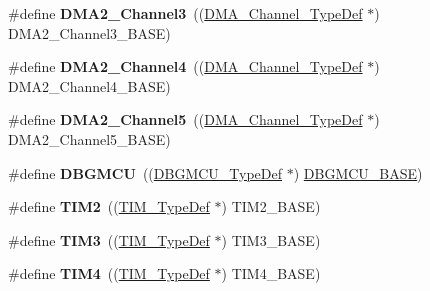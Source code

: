 \begin{DoxyCompactItemize}
\item 
\hypertarget{group___peripheral__declaration_ga6dca52a79587e0ca9a5d669048b4c7eb}{\#define {\bfseries D\-M\-A2\-\_\-\-Channel3}~((\hyperlink{struct_d_m_a___channel___type_def}{D\-M\-A\-\_\-\-Channel\-\_\-\-Type\-Def} $\ast$) D\-M\-A2\-\_\-\-Channel3\-\_\-\-B\-A\-S\-E)}\label{group___peripheral__declaration_ga6dca52a79587e0ca9a5d669048b4c7eb}

\item 
\hypertarget{group___peripheral__declaration_ga612b396657695191ad740b0b59bc9f12}{\#define {\bfseries D\-M\-A2\-\_\-\-Channel4}~((\hyperlink{struct_d_m_a___channel___type_def}{D\-M\-A\-\_\-\-Channel\-\_\-\-Type\-Def} $\ast$) D\-M\-A2\-\_\-\-Channel4\-\_\-\-B\-A\-S\-E)}\label{group___peripheral__declaration_ga612b396657695191ad740b0b59bc9f12}

\item 
\hypertarget{group___peripheral__declaration_ga521c13b7d0f82a6897d47995da392750}{\#define {\bfseries D\-M\-A2\-\_\-\-Channel5}~((\hyperlink{struct_d_m_a___channel___type_def}{D\-M\-A\-\_\-\-Channel\-\_\-\-Type\-Def} $\ast$) D\-M\-A2\-\_\-\-Channel5\-\_\-\-B\-A\-S\-E)}\label{group___peripheral__declaration_ga521c13b7d0f82a6897d47995da392750}

\item 
\hypertarget{group___peripheral__declaration_ga92ec6d9ec2251fda7d4ce09748cd74b4}{\#define {\bfseries D\-B\-G\-M\-C\-U}~((\hyperlink{struct_d_b_g_m_c_u___type_def}{D\-B\-G\-M\-C\-U\-\_\-\-Type\-Def} $\ast$) \hyperlink{group___peripheral__memory__map_ga4adaf4fd82ccc3a538f1f27a70cdbbef}{D\-B\-G\-M\-C\-U\-\_\-\-B\-A\-S\-E})}\label{group___peripheral__declaration_ga92ec6d9ec2251fda7d4ce09748cd74b4}

\item 
\hypertarget{group___peripheral__declaration_ga3cfac9f2e43673f790f8668d48b4b92b}{\#define {\bfseries T\-I\-M2}~((\hyperlink{struct_t_i_m___type_def}{T\-I\-M\-\_\-\-Type\-Def} $\ast$) T\-I\-M2\-\_\-\-B\-A\-S\-E)}\label{group___peripheral__declaration_ga3cfac9f2e43673f790f8668d48b4b92b}

\item 
\hypertarget{group___peripheral__declaration_ga61ee4c391385607d7af432b63905fcc9}{\#define {\bfseries T\-I\-M3}~((\hyperlink{struct_t_i_m___type_def}{T\-I\-M\-\_\-\-Type\-Def} $\ast$) T\-I\-M3\-\_\-\-B\-A\-S\-E)}\label{group___peripheral__declaration_ga61ee4c391385607d7af432b63905fcc9}

\item 
\hypertarget{group___peripheral__declaration_ga91a09bad8bdc7a1cb3d85cf49c94c8ec}{\#define {\bfseries T\-I\-M4}~((\hyperlink{struct_t_i_m___type_def}{T\-I\-M\-\_\-\-Type\-Def} $\ast$) T\-I\-M4\-\_\-\-B\-A\-S\-E)}\label{group___peripheral__declaration_ga91a09bad8bdc7a1cb3d85cf49c94c8ec}


\end{DoxyCompactItemize}
